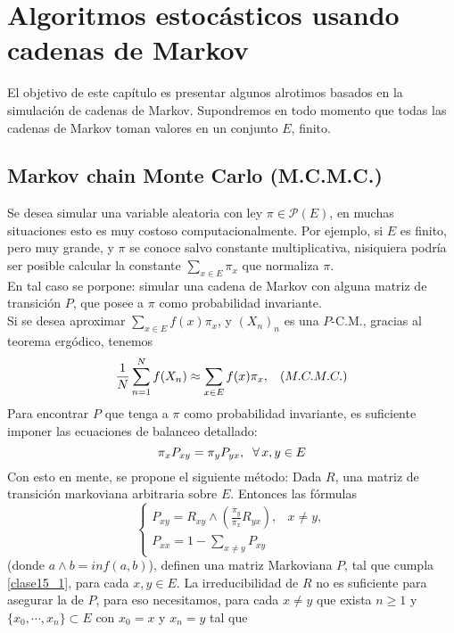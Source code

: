 \section{Algoritmos estocásticos usando cadenas de Markov}
El objetivo de este capítulo es presentar algunos alrotimos basados en la simulación de cadenas de Markov. Supondremos en todo momento que todas las cadenas de Markov toman valores en un conjunto $E$, finito.

\subsection{Markov chain Monte Carlo (M.C.M.C.)}
Se desea simular una variable aleatoria con ley $\pi \in \mathcal{P}(E)$, en muchas situaciones esto es muy costoso computacionalmente. Por ejemplo, si $E$ es finito, pero muy grande, y $\pi$ se conoce salvo constante multiplicativa, nisiquiera podría ser posible calcular la constante $\sum_{x\in E}\pi_x$ que normaliza $\pi$.\\ \newline
En tal caso se porpone: simular una cadena de Markov con alguna matriz de transición $P$, que posee a $\pi$ como probabilidad invariante.\\ \newline
Si se desea aproximar $\sum_{x\in E} f(x)\pi_x$, y $(X_n)_n$ es una $P$-C.M., gracias al teorema ergódico, tenemos
\[\frac{1}{N} \sum_{n=1}^N f(X_n) \approx \sum_{x\in E}f(x)\pi_x,\hspace{0.3cm}(M.C.M.C.)\]
Para encontrar $P$ que tenga a $\pi$ como probabilidad invariante, es suficiente imponer las ecuaciones de balanceo detallado:
\begin{equation}
    \pi_x P_{xy} = \pi_y P_{yx},\hspace{0.2cm}\forall\,x,y\in E
    \label{clase15_1}
\end{equation}
Con esto en mente, se propone el siguiente método: Dada $R$, una matriz de transición markoviana arbitraria sobre $E$. Entonces las fórmulas
\begin{equation}
    \begin{cases}
        P_{xy} = R_{xy}\wedge \left(\frac{\pi_y}{\pi_x}R_{yx}\right), & x \neq y,\\
        P_{xx} = 1-\sum_{x\neq y}P_{xy}
    \end{cases}
    \label{clase15_2}
\end{equation}
(donde $a\wedge b = inf(a,b)$), definen una matriz Markoviana $P$, tal que cumpla \ref{clase15_1}, para cada $x,y\in E$. La irreducibilidad de $R$ no es suficiente para asegurar la de $P$, para eso necesitamos, para cada $x\neq y$ que exista $n\geq 1$ y $\{x_0,\cdots,x_n\} \subset E$ con $x_0 = x$ y $x_n=y$ tal que
